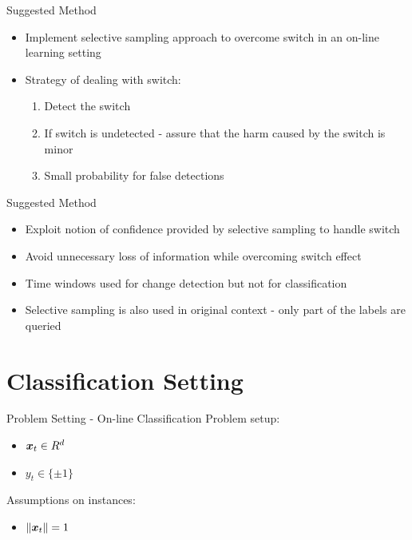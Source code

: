 \documentclass{beamer}
\begin{document}
\begin{frame}{Suggested Method}
\begin{itemize}
\item Implement selective sampling approach to overcome switch in an on-line learning setting\newline
\item Strategy of dealing with switch:\newline
\begin{enumerate}
\item Detect the switch\newline
\item If switch is undetected - assure that the harm caused by the switch is minor\newline
\item Small probability for false detections
\end{enumerate}
\end{itemize}

\end{frame}

\begin{frame}{Suggested Method}
\begin{itemize}
\item Exploit notion of confidence provided by selective sampling to handle switch\newline
\item Avoid unnecessary loss of information while overcoming switch effect\newline
\item Time windows used for change detection but not for classification\newline
\item Selective sampling is also used in original context - only part of the labels are queried
\end{itemize}
\end{frame}



\section{Classification Setting}




\begin{frame}{Problem Setting - On-line Classification}
Problem setup:\newline
\begin{itemize}
\item ${\boldsymbol{x}}_{t}\in R^d$\newline
\item $y_t\in\{\pm1\}$\newline
\end{itemize}
Assumptions on instances:\newline
\begin{itemize}
\item $\|{\boldsymbol{x}}_{t}\|=1$
\end{itemize}
\end{frame}
\end{document}
